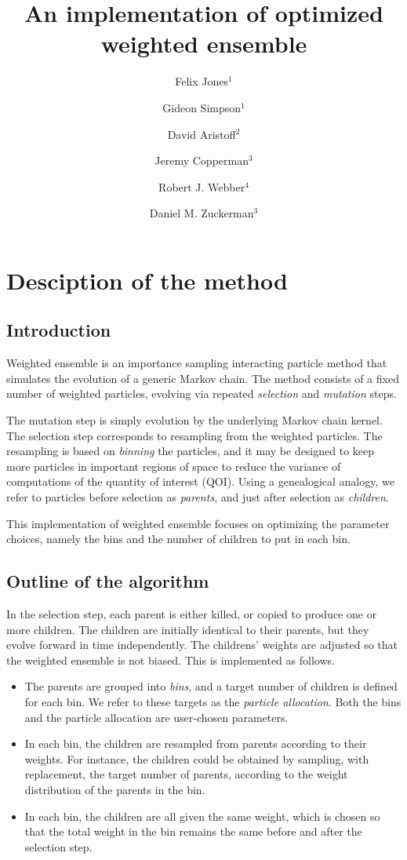 \documentclass[11pt,letterpaper]{amsart}
\title{An implementation of optimized weighted ensemble}
\author{Felix Jones$^1$}
\author{Gideon Simpson$^1$}
\author{David Aristoff$^2$}
\author{Jeremy Copperman$^3$}
\author{Robert J. Webber$^4$}
\author{Daniel M. Zuckerman$^3$}
\theoremstyle{plain}
\theoremstyle{definition}
\numberwithin{equation}{section}
\begin{document}
\maketitle

\section{Desciption of the method}

\subsection{Introduction} Weighted ensemble is an 
importance sampling interacting 
particle method that simulates 
the evolution of a generic 
Markov chain. 
The method consists of a fixed number of 
weighted particles, 
evolving via repeated 
{\em selection} and {\em mutation} steps. 

The mutation step 
is simply evolution by the underlying 
Markov chain kernel.
The selection step corresponds to 
resampling from the weighted particles. 
The resampling is based on {\em binning} 
the particles, 
and it may be designed 
to keep more particles in important 
regions of space to reduce the 
variance of computations of the 
quantity of interest (QOI). 
Using a genealogical 
analogy, we refer to particles 
before selection as {\em parents}, 
and just after selection as {\em children}.

This implementation of weighted ensemble 
focuses on optimizing the parameter 
choices, namely the bins and the 
number of children to put in each bin.

\subsection{Outline of the algorithm}

In the selection step, each 
parent is either killed, or copied 
to produce one or more children. The 
children are initially identical to 
their parents, but they evolve forward 
in time independently. The
childrens' weights are 
adjusted so that 
the weighted ensemble is not 
biased. This is implemented as follows.
\begin{itemize}
\item The parents are grouped
into {\em bins}, 
and a target number of 
children is defined for each bin. We refer 
to these targets as the {\em particle allocation}. 
Both the bins and the particle allocation 
are user-chosen parameters. 
\item In each bin, the  
children are resampled
from parents according to their weights. 
For instance, the 
children could be obtained by
sampling, with replacement, 
the target number of parents, 
according to the weight distribution 
of the parents in the bin. 
\item
In each bin, the children 
are all given the same weight, which is 
chosen so that the total weight 
in the bin remains the same before 
and after the selection step.
\end{itemize}
\end{document}
